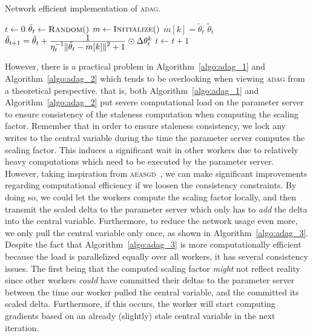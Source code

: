 \begin{algorithm}[H]
  \caption{Network efficient implementation of \textsc{adag}.}
  \label{algo:adag_2}
  \begin{algorithmic}[1]
    \State $t \gets 0$ 
    \State $\tilde{\theta}_t \gets \Call{Random}$
    \State $m \gets \Call{Initialize}$ 
    \State
     
    \State $m[k] = \tilde{\theta}_t$
    \State \Return $\tilde{\theta}_{t}$
    \EndProcedure
    \State
    \State $\tilde{\theta}_{t + 1} = \tilde{\theta}_t + \frac{\displaystyle 1}{\displaystyle \eta_t^{-1}\|\tilde{\theta}_t - m[k]\|^2 + 1} \odot \Delta\theta^k_t$
    \State $t \gets t + 1$
    \EndProcedure
    \State
    \EndProcedure
  \end{algorithmic}
\end{algorithm}

However, there is a practical problem in Algorithm~\ref{algo:adag_1} and Algorithm~\ref{algo:adag_2} which tends to be overlooking when viewing \textsc{adag} from a theoretical perspective. that is, both Algorithm~\ref{algo:adag_1} and Algorithm~\ref{algo:adag_2} put severe computational load on the parameter server to ensure consistency of the staleness computation when computing the scaling factor. Remember that in order to ensure staleness consistency, we lock any writes to the central variable during the time the parameter server computes the scaling factor. This induces a significant wait in other workers due to relatively heavy computations which need to be executed by the parameter server. However, taking inspiration from \textsc{aeasgd}~\cite{zhang2015deep}, we can make significant improvements regarding computational efficiency if we loosen the consistency constraints. By doing so, we could let the workers compute the scaling factor locally, and then transmit the scaled delta to the parameter server which only has to \emph{add} the delta into the central variable. Furthermore, to reduce the network usage even more, we only pull the central variable only once, as shown in Algorithm~\ref{algo:adag_3}. Despite the fact that Algorithm~\ref{algo:adag_3} is more computationally efficient because the load is parallelized equally over all workers, it has several consistency issues. The first being that the computed scaling factor \emph{might} not reflect reality since other workers \emph{could} have committed their deltas to the parameter server between the time our worker pulled the central variable, and the committed its scaled delta. Furthermore, if this occurs, the worker will start computing gradients based on an already (slightly) stale central variable in the next iteration.

